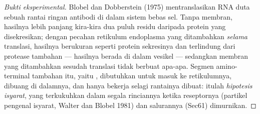 \begin{proof}[Bukti eksperimental]
Blobel dan Dobberstein (1975) mentranslasikan RNA duta sebuah rantai ringan
antibodi di dalam sistem bebas sel. Tanpa membran, hasilnya lebih panjang
kira-kira dua puluh residu daripada protein yang disekresikan;
dengan pecahan retikulum endoplasma yang ditambahkan \emph{selama} translasi,
hasilnya berukuran seperti protein sekresinya dan terlindung dari protease
tambahan --- hasilnya berada di dalam vesikel --- sedangkan membran yang
ditambahkan sesudah translasi tidak berbuat apa-apa. Segmen amino-terminal
tambahan itu, yaitu , dibutuhkan untuk masuk ke retikulumnya,
dibuang di dalamnya, dan hanya bekerja selagi rantainya dibuat: itulah
\emph{hipotesis isyarat}, yang terkukuhkan dalam segala rinciannya ketika
reseptornya (partikel pengenal isyarat, Walter dan Blobel 1981) dan salurannya
(Sec61) dimurnikan.
\end{proof}

